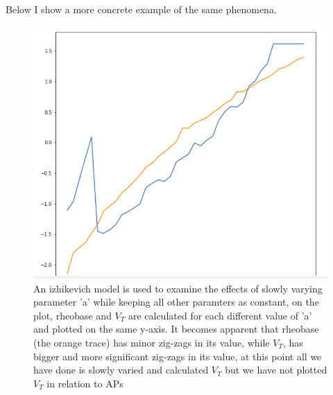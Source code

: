 Below I show a more concrete example of the same phenomena.
\begin{figure}
\begin{center}
\includegraphics[]{figures/rh_vs_vt.png}
\caption{An izhikevich model is used to examine the effects of slowly varying parameter 'a' while keeping all other paramters as constant, on the plot, rheobase and $V_{T}$ are calculated for each different value of 'a' and plotted on the same y-axis. It becomes apparent that rheobase (the orange trace) has minor zig-zags in its value, while $V_{T}$, has bigger and more significant zig-zags in its value, at this point all we have done is slowly varied and calculated $V_{T}$ but we have not plotted $V_{T}$ in relation to APs}
\end{center}
\end{figure}

